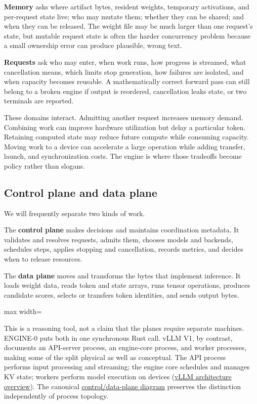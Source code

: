 \documentclass[
  10pt,
]{article}
\begin{document}
\textbf{Memory} asks where artifact bytes, resident weights, temporary
activations, and per-request state live; who may mutate them; whether
they can be shared; and when they can be released. The weight file may
be much larger than one request's state, but mutable request state is
often the harder concurrency problem because a small ownership error can
produce plausible, wrong text.

\textbf{Requests} ask who may enter, when work runs, how progress is
streamed, what cancellation means, which limits stop generation, how
failures are isolated, and when capacity becomes reusable. A
mathematically correct forward pass can still belong to a broken engine
if output is reordered, cancellation leaks state, or two terminals are
reported.

These domains interact. Admitting another request increases memory
demand. Combining work can improve hardware utilization but delay a
particular token. Retaining computed state may reduce future compute
while consuming capacity. Moving work to a device can accelerate a large
operation while adding transfer, launch, and synchronization costs. The
engine is where those tradeoffs become policy rather than slogans.

\subsection{Control plane and data
plane}\label{control-plane-and-data-plane}

We will frequently separate two kinds of work.

The \textbf{control plane} makes decisions and maintains coordination
metadata. It validates and resolves requests, admits them, chooses
models and backends, schedules steps, applies stopping and cancellation,
records metrics, and decides when to release resources.

The \textbf{data plane} moves and transforms the bytes that implement
inference. It loads weight data, reads token and state arrays, runs
tensor operations, produces candidate scores, selects or transfers token
identities, and sends output bytes.

\begin{center}\begin{adjustbox}{max width=\linewidth}\end{adjustbox}\end{center}

This is a reasoning tool, not a claim that the planes require separate
machines. ENGINE-0 puts both in one synchronous Rust call. vLLM V1, by
contrast, documents an API-server process, an engine-core process, and
worker processes, making some of the split physical as well as
conceptual. The API process performs input processing and streaming; the
engine core schedules and manages KV state; workers perform model
execution on devices
(\href{https://docs.vllm.ai/en/latest/design/arch_overview/}{vLLM
architecture overview}). The canonical
\href{https://github.com/hermonai/inside-the-llm-engine/blob/astra-visual-rewrite/diagrams/runtime/control-plane-data-plane.txt}{control/data-plane
diagram} preserves the distinction independently of process topology.
\end{document}
